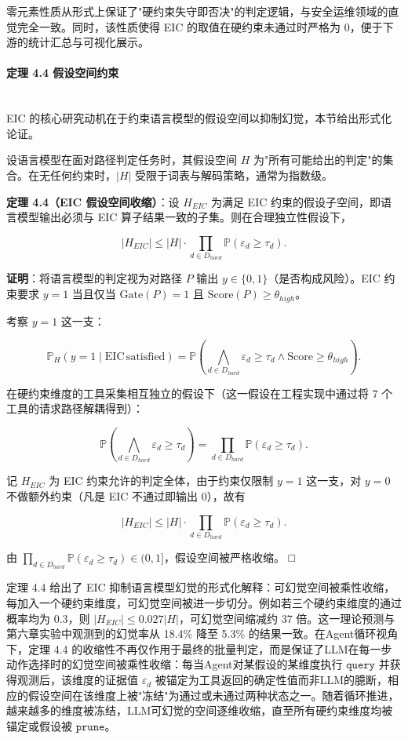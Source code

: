 \documentclass[a4paper,12pt]{ctexart}
\begin{document}
零元素性质从形式上保证了"硬约束失守即否决"的判定逻辑，与安全运维领域的直觉完全一致。同时，该性质使得 EIC 的取值在硬约束未通过时严格为 0，便于下游的统计汇总与可视化展示。

\paragraph{定理 4.4 假设空间约束}\mbox{}\\

EIC 的核心研究动机在于约束语言模型的假设空间以抑制幻觉，本节给出形式化论证。

设语言模型在面对路径判定任务时，其假设空间 $H$ 为"所有可能给出的判定"的集合。在无任何约束时，$|H|$ 受限于词表与解码策略，通常为指数级。

\textbf{定理 4.4（EIC 假设空间收缩）}：设 $H_{EIC}$ 为满足 EIC 约束的假设子空间，即语言模型输出必须与 EIC 算子结果一致的子集。则在合理独立性假设下，

\[
|H_{EIC}| \leq |H| \cdot \prod_{d \in D_{hard}} \mathbb{P}(\varepsilon_d \geq \tau_d).
\]

\textbf{证明}：将语言模型的判定视为对路径 $P$ 输出 $y \in \{0, 1\}$（是否构成风险）。EIC 约束要求 $y = 1$ 当且仅当 $\text{Gate}(P)=1$ 且 $\text{Score}(P) \geq \theta_{high}$。

考察 $y=1$ 这一支：

\[
\mathbb{P}_{H}(y=1 \mid \text{EIC}\,\text{satisfied}) = \mathbb{P}\!\left(\bigwedge_{d \in D_{hard}} \varepsilon_d \geq \tau_d \wedge \text{Score} \geq \theta_{high}\right).
\]

在硬约束维度的工具采集相互独立的假设下（这一假设在工程实现中通过将 7 个工具的请求路径解耦得到）：

\[
\mathbb{P}\!\left(\bigwedge_{d \in D_{hard}} \varepsilon_d \geq \tau_d\right) = \prod_{d \in D_{hard}} \mathbb{P}(\varepsilon_d \geq \tau_d).
\]

记 $H_{EIC}$ 为 EIC 约束允许的判定全体，由于约束仅限制 $y=1$ 这一支，对 $y=0$ 不做额外约束（凡是 EIC 不通过即输出 0），故有

\[
|H_{EIC}| \leq |H| \cdot \prod_{d \in D_{hard}} \mathbb{P}(\varepsilon_d \geq \tau_d).
\]

由 $\prod_{d \in D_{hard}} \mathbb{P}(\varepsilon_d \geq \tau_d) \in (0, 1]$，假设空间被严格收缩。 □

定理 4.4 给出了 EIC 抑制语言模型幻觉的形式化解释：可幻觉空间被乘性收缩，每加入一个硬约束维度，可幻觉空间被进一步切分。例如若三个硬约束维度的通过概率均为 0.3，则 $|H_{EIC}| \leq 0.027 |H|$，可幻觉空间缩减约 37 倍。这一理论预测与第六章实验中观测到的幻觉率从 18.4\% 降至 5.3\% 的结果一致。在Agent循环视角下，定理 4.4 的收缩性不再仅作用于最终的批量判定，而是保证了LLM在每一步动作选择时的幻觉空间被乘性收缩：每当Agent对某假设的某维度执行 $\texttt{query}$ 并获得观测后，该维度的证据值 $\varepsilon_d$ 被锚定为工具返回的确定性值而非LLM的臆断，相应的假设空间在该维度上被"冻结"为通过或未通过两种状态之一。随着循环推进，越来越多的维度被冻结，LLM可幻觉的空间逐维收缩，直至所有硬约束维度均被锚定或假设被 $\texttt{prune}$。
\end{document}
